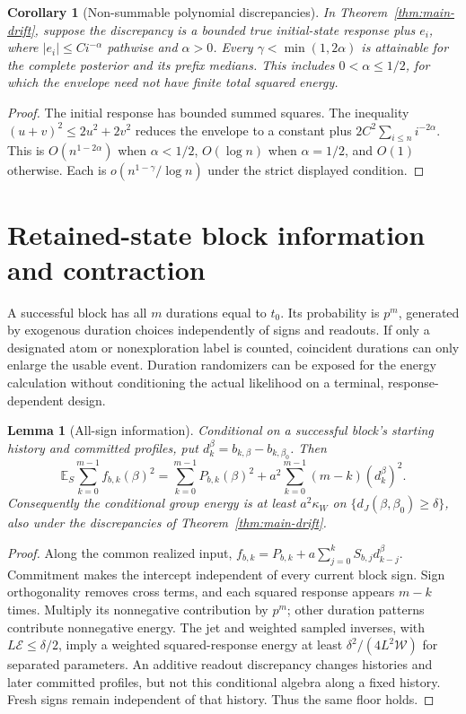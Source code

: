 \documentclass[11pt,reqno]{amsart}
\newtheorem{lemma}[theorem]{Lemma}
\newtheorem{corollary}[theorem]{Corollary}
\theoremstyle{remark}\newtheorem{remark}[theorem]{Remark}
\newcommand{\E}{\mathbb E}\newcommand{\Pp}{\mathbb P}
\begin{document}
\begin{corollary}[Non-summable polynomial discrepancies]
\label{cor:polynomial-drift}
In Theorem~\ref{thm:main-drift}, suppose the discrepancy is a bounded true
initial-state response plus $e_i$, where $|e_i|\le C i^{-\alpha}$ pathwise
and $\alpha>0$. Every $\gamma<\min(1,2\alpha)$ is attainable for the
complete posterior and its prefix medians. This includes $0<\alpha\le1/2$,
for which the envelope need not have finite total squared energy.
\end{corollary}
\begin{proof}
The initial response has bounded summed squares. The inequality
$(u+v)^2\le2u^2+2v^2$ reduces the envelope to a constant plus
$2C^2\sum_{i\le n}i^{-2\alpha}$. This is $O(n^{1-2\alpha})$ when
$\alpha<1/2$, $O(\log n)$ when $\alpha=1/2$, and $O(1)$ otherwise.
Each is $o(n^{1-\gamma}/\log n)$ under the strict displayed condition.
\end{proof}

\section{Retained-state block information and contraction}
\label{sec:blocks}
A successful block has all $m$ durations equal to $t_0$. Its probability is
$p^m$, generated by exogenous duration choices independently of signs and
readouts. If only a designated atom or nonexploration label is counted,
coincident durations can only enlarge the usable event. Duration randomizers
can be exposed for the energy calculation without conditioning the actual
likelihood on a terminal, response-dependent design.

\begin{lemma}[All-sign information]
\label{lem:block-floor}
Conditional on a successful block's starting history and committed profiles,
put $d_k^{\beta}=b_{k,\beta}-b_{k,\beta_0}$. Then
\begin{equation}
 \E_S\sum_{k=0}^{m-1}f_{b,k}(\beta)^2
 =\sum_{k=0}^{m-1}P_{b,k}(\beta)^2
   +a^2\sum_{k=0}^{m-1}(m-k)(d_k^{\beta})^2.
 \label{eq:all-signs}
\end{equation}
Consequently the conditional group energy is at least $a^2\kappa_W$ on
$\{d_J(\beta,\beta_0)\ge\delta\}$, also under the discrepancies of
Theorem~\ref{thm:main-drift}.
\end{lemma}
\begin{proof}
Along the common realized input,
$f_{b,k}=P_{b,k}+a\sum_{j=0}^k S_{b,j}d_{k-j}^{\beta}$.
Commitment makes the intercept independent of every current block sign.
Sign orthogonality removes cross terms, and each squared response appears
$m-k$ times. Multiply its nonnegative contribution by $p^m$; other duration
patterns contribute nonnegative energy. The jet and weighted sampled inverses,
with $L\mathcal E\le\delta/2$, imply a weighted squared-response energy at
least $\delta^2/(4L^2\mathcal W)$ for separated parameters.
An additive readout discrepancy changes histories and later committed
profiles, but not this conditional algebra along a fixed history. Fresh
signs remain independent of that history. Thus the same floor holds.
\end{proof}
\end{document}
